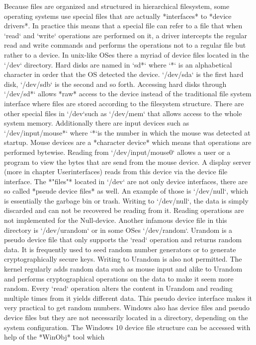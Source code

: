 Because files are organized and structured in hierarchical filesystem, some operating systems use special
files that are actually *interfaces* to *device drivers*. In practice this means that a special file can
refer to a file that when `read` and `write` operations are performed on it, a driver intercepts the regular
read and write commands and performs the operations not to a regular file but rather to a device. In unix-like
OSes there a myriad of device files located in the `/dev` directory. Hard disks are named in `sd*` where `*`
is an alphabetical character in order that the OS detected the device. `/dev/sda` is the first hard disk,
`/dev/sdb` is the second and so forth. Accessing hard disks through `/dev/sd*` allows *raw* access to the
device instead of the traditional file system interface where files are stored according to the filesystem
structure. There are other special files in `/dev`such as `/dev/mem` that allows access to the whole system
memory. Additionally there are input devices such as `/dev/input/mouse*` where `*`is the number in which the
mouse was detected at startup. Mouse devices are a *character device* which means that operations are performed
bytewise. Reading from `/dev/input/mouse0` allows a user or a program to view the bytes that are send from the
mouse device. A display server (more in chapter Userinterfaces) reads from this device via the device file
interface. The *"files"* located in `/dev` are not only device interfaces, there are so called *pseude device files*
as well. An example of those is `/dev/null`, which is essentially the garbage bin or trash. Writing to `/dev/null`,
the data is simply discarded and can not be recovered be reading from it. Reading operations are not implemented for
the Null-device. Another infamous device file in this directory is `/dev/urandom` or in some OSes `/dev/random`. Urandom is a pseudo device file
that only supports the `read` operation and returns random data. It is frequently used to seed random number
generators or to generate cryptographically secure keys. Writing to Urandom is also not permitted. The kernel regularly
adds random data such as mouse input and alike to Urandom and performs cryptographical operations on the data to make
it seem more random. Every `read` operation alters the content in Urandom and reading multiple times from it yields
different data. This pseudo device interface makes it very practical to get random numbers.
Windows also has device files and pseudo device files but they are not necessarily located in a directory, depending
on the system configuration. The Windows 10 device file structure can be accessed with help of the *WinObj* tool which
